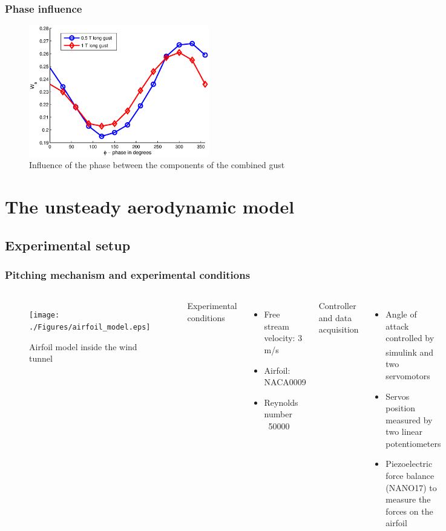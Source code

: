 \documentclass[compress]{beamer}
\begin{document}
\begin{frame}
  \frametitle{Phase influence}
\begin{figure}[ht]
  \begin{center}
    \includegraphics[width=0.7\textwidth]{./Figures/combined_gust_amplitude_vs_phase_LUT.eps}
  \end{center}
  \caption{Influence of the phase between the components of the combined gust}
  \label{fig:combined_amplitude_phase}
\end{figure}
\end{frame}


\section[GK model]{The unsteady aerodynamic model}

\subsection{Experimental setup}

\begin{frame}[shrink]
  \frametitle{Pitching mechanism and experimental conditions}
  \begin{columns}
    \begin{figure}[h]
      \begin{center}
	\texttt{[image: ./Figures/airfoil\_model.eps]}
      \end{center}
      \caption{Airfoil model inside the wind tunnel}
    \end{figure}
    Experimental conditions
    \begin{itemize}
      \item Free stream velocity: 3 m/s
      \item Airfoil: NACA0009
      \item Reynolds number ~50000
    \end{itemize}
    Controller and data acquisition
    \begin{itemize}
      \item Angle of attack controlled by simulink\textsuperscript{\textregistered} and two servomotors 
      \item Servos position measured by two linear potentiometers
      \item Piezoelectric force balance (NANO17) to measure the forces on the airfoil
    \end{itemize}
  \end{columns}
\end{frame}
\end{document}
